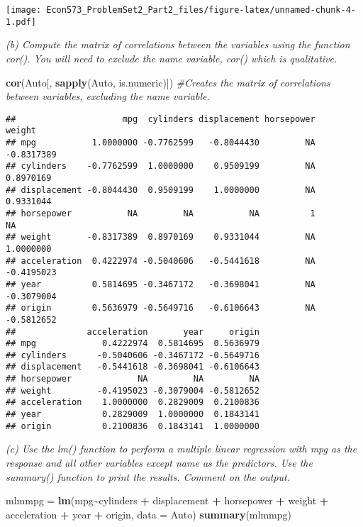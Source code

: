 \documentclass[
]{article}
\newenvironment{Shaded}{\begin{snugshade}}{\end{snugshade}}
\newcommand{\AttributeTok}[1]{\textcolor[rgb]{0.13,0.29,0.53}{#1}}
\newcommand{\CommentTok}[1]{\textcolor[rgb]{0.56,0.35,0.01}{\textit{#1}}}
\newcommand{\FunctionTok}[1]{\textcolor[rgb]{0.13,0.29,0.53}{\textbf{#1}}}
\newcommand{\NormalTok}[1]{#1}
\newcommand{\OtherTok}[1]{\textcolor[rgb]{0.56,0.35,0.01}{#1}}
\newcommand{\SpecialCharTok}[1]{\textcolor[rgb]{0.81,0.36,0.00}{\textbf{#1}}}
\begin{document}
\texttt{[image: Econ573\_ProblemSet2\_Part2\_files/figure-latex/unnamed-chunk-4-1.pdf]}

\emph{(b) Compute the matrix of correlations between the variables using
the function cor(). You will need to exclude the name variable, cor()
which is qualitative.}

\begin{Shaded}
\begin{Highlighting}[]
\FunctionTok{cor}\NormalTok{(Auto[, }\FunctionTok{sapply}\NormalTok{(Auto, is.numeric)]) }\CommentTok{\#Creates the matrix of correlations between variables, excluding the name variable.}
\end{Highlighting}
\end{Shaded}

\begin{verbatim}
##                     mpg  cylinders displacement horsepower     weight
## mpg           1.0000000 -0.7762599   -0.8044430         NA -0.8317389
## cylinders    -0.7762599  1.0000000    0.9509199         NA  0.8970169
## displacement -0.8044430  0.9509199    1.0000000         NA  0.9331044
## horsepower           NA         NA           NA          1         NA
## weight       -0.8317389  0.8970169    0.9331044         NA  1.0000000
## acceleration  0.4222974 -0.5040606   -0.5441618         NA -0.4195023
## year          0.5814695 -0.3467172   -0.3698041         NA -0.3079004
## origin        0.5636979 -0.5649716   -0.6106643         NA -0.5812652
##              acceleration       year     origin
## mpg             0.4222974  0.5814695  0.5636979
## cylinders      -0.5040606 -0.3467172 -0.5649716
## displacement   -0.5441618 -0.3698041 -0.6106643
## horsepower             NA         NA         NA
## weight         -0.4195023 -0.3079004 -0.5812652
## acceleration    1.0000000  0.2829009  0.2100836
## year            0.2829009  1.0000000  0.1843141
## origin          0.2100836  0.1843141  1.0000000
\end{verbatim}

\emph{(c) Use the lm() function to perform a multiple linear regression
with mpg as the response and all other variables except name as the
predictors. Use the summary() function to print the results. Comment on
the output.}

\begin{Shaded}
\begin{Highlighting}[]
\NormalTok{mlmmpg }\OtherTok{=} \FunctionTok{lm}\NormalTok{(mpg}\SpecialCharTok{\textasciitilde{}}\NormalTok{cylinders }\SpecialCharTok{+}\NormalTok{ displacement }\SpecialCharTok{+}\NormalTok{ horsepower }\SpecialCharTok{+}\NormalTok{ weight }\SpecialCharTok{+}\NormalTok{ acceleration }\SpecialCharTok{+}\NormalTok{ year }\SpecialCharTok{+}\NormalTok{ origin, }\AttributeTok{data =}\NormalTok{ Auto)}
\FunctionTok{summary}\NormalTok{(mlmmpg)}
\end{Highlighting}
\end{Shaded}
\end{document}
